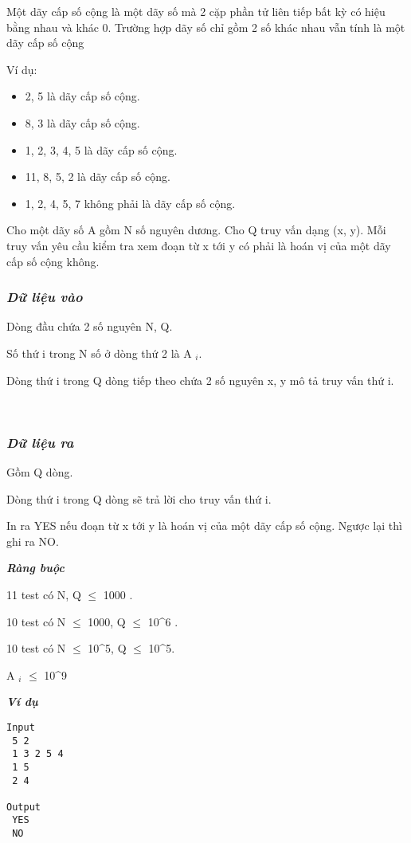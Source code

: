 

Một dãy cấp số cộng là một dãy số mà 2 cặp phần tử liên tiếp bất kỳ có hiệu bằng nhau và khác 0. Trường hợp dãy số chỉ gồm 2 số khác nhau vẫn tính là một dãy cấp số cộng

Ví dụ:
\begin{itemize}
	\item 2, 5 là dãy cấp số cộng.
	\item 8, 3 là dãy cấp số cộng.
	\item 1, 2, 3, 4, 5 là dãy cấp số cộng.
	\item 11, 8, 5, 2 là dãy cấp số cộng.
	\item 1, 2, 4, 5, 7 không phải là dãy cấp số cộng.
\end{itemize}

Cho một dãy số A gồm N số nguyên dương. Cho Q truy vấn dạng (x, y). Mỗi truy vấn yêu cầu kiểm tra xem đoạn từ x tới y có phải là hoán vị của một dãy cấp số cộng không.

\subsubsection{\emph{Dữ liệu vào }}

Dòng đầu chứa 2 số nguyên N, Q.

Số thứ i trong N số ở dòng thứ 2 là A $_ i. $

Dòng thứ i trong Q dòng tiếp theo chứa 2 số nguyên x, y mô tả truy vấn thứ i.

 

\subsubsection{\emph{Dữ liệu ra }}

Gồm Q dòng.

Dòng thứ i trong Q dòng sẽ trả lời cho truy vấn thứ i.

In ra YES nếu đoạn từ x tới y là hoán vị của một dãy cấp số cộng. Ngược lại thì ghi ra NO.

\emph{\textbf{Ràng buộc }}

11 test có N, Q  $\le$  1000 .

10 test có N  $\le$  1000, Q  $\le$  10\textasciicircum6 .

10 test có N  $\le$  10\textasciicircum5, Q  $\le$  10\textasciicircum5.

A $_ i $  $\le$  10\textasciicircum9

\emph{\textbf{Ví dụ }}
\begin{verbatim}
Input
 5 2
 1 3 2 5 4
 1 5
 2 4

Output
 YES
 NO


\end{verbatim}

 
